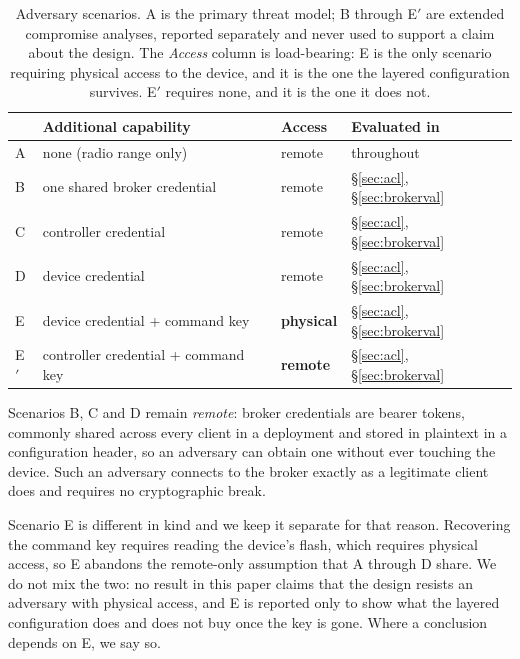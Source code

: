 \begin{table}[htbp]
\centering\small
\caption{Adversary scenarios. A is the primary threat model; B through E$'$ are extended
compromise analyses, reported separately and never used to support a claim about the design.
The \emph{Access} column is load-bearing: E is the only scenario requiring physical access to
the device, and it is the one the layered configuration survives. E$'$ requires none, and it is
the one it does not.}
\label{tab:threats}
\begin{tabular}{@{}llll@{}}
\toprule
& Additional capability & Access & Evaluated in \\
\midrule
A & none (radio range only)      & remote   & throughout \\
B & one shared broker credential & remote   & \S\ref{sec:acl}, \S\ref{sec:brokerval} \\
C & controller credential        & remote   & \S\ref{sec:acl}, \S\ref{sec:brokerval} \\
D & device credential            & remote   & \S\ref{sec:acl}, \S\ref{sec:brokerval} \\
E & device credential + command key & \textbf{physical} & \S\ref{sec:acl}, \S\ref{sec:brokerval} \\
E$'$ & controller credential + command key & \textbf{remote} & \S\ref{sec:acl}, \S\ref{sec:brokerval} \\
\bottomrule
\end{tabular}
\end{table}

Scenarios B, C and D remain \emph{remote}: broker credentials are bearer tokens, commonly
shared across every client in a deployment and stored in plaintext in a configuration header,
so an adversary can obtain one without ever touching the device. Such an adversary connects to
the broker exactly as a legitimate client does and requires no cryptographic break.

Scenario E is different in kind and we keep it separate for that reason. Recovering the command
key requires reading the device's flash, which requires physical access, so E abandons the
remote-only assumption that A through D share. We do not mix the two: no result in this paper
claims that the design resists an adversary with physical access, and E is reported only to
show what the layered configuration does and does not buy once the key is gone. Where a
conclusion depends on E, we say so.

